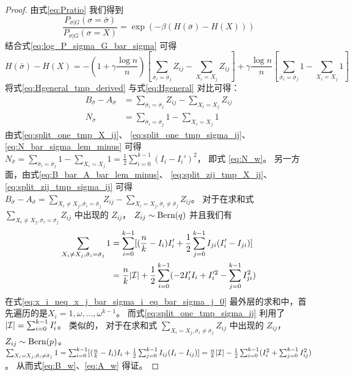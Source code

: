 \begin{proof}
  由式\eqref{eq:Pratio} 我们得到
  \begin{equation}
    \frac{P_{\sigma |G } (\sigma = \bar{\sigma})}
    {P_{\sigma |G } (\sigma = X)}
    = \exp(-\beta(H(\bar{\sigma})
    - H(X)))
  \end{equation}
  结合式\eqref{eq:log_P_sigma_G_bar_sigma}
  可得
  \begin{equation}\label{eq:Hgeneral_tmp_derived}
    H(\bar{\sigma}) - H(X)=
    -\left(1 + \gamma \frac{ \log n}{n}
    \right)
    \left[
      \sum_{\bar{\sigma}_i = \bar{\sigma}_j}Z_{ij} - \sum_{X_i = X_j}Z_{ij}
      \right]
    + \gamma\frac{ \log n}{n}
    \left[\sum_{\bar{\sigma}_i = \bar{\sigma}_j}1 - \sum_{X_i = X_j}1
    \right]
    \end{equation}
  将式\eqref{eq:Hgeneral_tmp_derived} 与式\eqref{eq:Hgeneral}
  对比可得：
  \begin{align}
    B_{\bar{\sigma}} - A_{\bar{\sigma}} &=
    \sum_{\bar{\sigma}_i = \bar{\sigma}_j}Z_{ij}
    - \sum_{X_i = X_j}Z_{ij}
    \label{eq:B_bar_A_bar_lem_minus}\\
    N_{\bar{\sigma}} &=
    \sum_{\bar{\sigma}_i = \bar{\sigma}_j} 1  -\sum_{X_i = X_j} 1
    \label{eq:N_bar_sigma_lem_minus}
  \end{align}
  由式\eqref{eq:split_one_tmp_X_ij}、
  \eqref{eq:split_one_tmp_sigma_ij}、 
  \eqref{eq:N_bar_sigma_lem_minus} 可得
  $N_{\bar{\sigma}} = \sum_{\bar{\sigma}_i = \bar{\sigma}_j} 1  -\sum_{X_i = X_j} 1 = \frac{1}{2}\sum_{i=0}^{k-1} (I_i - I_i')^2 $，
  即式 \eqref{eq:N_w}。
	另一方面，由式\eqref{eq:B_bar_A_bar_lem_minus}、
  \eqref{eq:split_zij_tmp_X_ij}、 
  \eqref{eq:split_zij_tmp_sigma_ij}
  可得 $B_{\bar{\sigma}} - A_{\bar{\sigma}} = \sum_{X_i \neq X_j, \bar{\sigma}_i = \bar{\sigma}_j} Z_{ij} - \sum_{X_i = X_j, \bar{\sigma}_i \neq \bar{\sigma}_j} Z_{ij}$。
	对于在求和式 $\sum_{X_i \neq X_j, \bar{\sigma}_i = \bar{\sigma}_j} Z_{ij}$
  中出现的 $Z_{ij}$， $Z_{ij} \sim \operatorname{Bern}(q)$
  并且我们有
  \begin{align}
  \sum_{X_i \neq X_j, \bar{\sigma}_i = \bar{\sigma}_j} 1 
  &= \sum_{i=0}^{k-1}[(\frac{n}{k} - I_i) I_i' + \frac{1}{2} \sum_{j=0}^{k-1} I_{ji}(I'_i - I_{ji}) ] 
  \label{eq:x_i_neq_x_j_bar_sigma_i_eq_bar_sigma_j_0}\\
	&=\frac{n}{k}|\mathcal{I}| + \frac{1}{2}\sum_{i=0}^{k-1}  (-2 I'_i I_i  + I'^2_i - \sum_{j=0}^{k-1} I^2_{ji}) 
  \label{eq:x_i_neq_x_j_bar_sigma_i_eq_bar_sigma_j_1}
  \end{align}
  在式\eqref{eq:x_i_neq_x_j_bar_sigma_i_eq_bar_sigma_j_0}
  最外层的求和中，首先遍历的是$X_i=1, \omega, \dots, \omega^{k-1}$。  
  而式\eqref{eq:split_one_tmp_sigma_ij}
  利用了
  $|\mathcal{I}| = \sum_{i=0}^{k-1} I'_i$。
  类似的，
  对于在求和式 $\sum_{X_i = X_j, \bar{\sigma}_i \neq \bar{\sigma}_j} Z_{ij}$
  中出现的 $Z_{ij}$， $Z_{ij} \sim \operatorname{Bern}(p)$。
	$\sum_{X_i = X_j, \bar{\sigma}_i \neq \bar{\sigma}_j} 1
	= \sum_{i=0}^{k-1}[(\frac{n}{k} - I_i) I_i + \frac{1}{2} \sum_{j=0}^{k-1} I_{ij}(I_i - I_{ij}) ] 
	= \frac{n}{k}|\mathcal{I}| - \frac{1}{2}\sum_{i=0}^{k-1}  (I^2_i + \sum_{j=0}^{k-1} I^2_{ij})$。
  从而式\eqref{eq:B_w}、\eqref{eq:A_w} 得证。
\end{proof}

